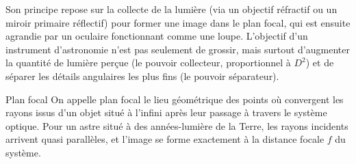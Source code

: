 \documentclass[12pt,a4paper]{report}
\begin{document}
    

Son principe repose sur la collecte de la lumière (via un objectif réfractif ou un miroir primaire réflectif) pour former une image dans le plan focal, qui est ensuite agrandie par un oculaire fonctionnant comme une loupe. L'objectif d'un instrument d'astronomie n'est pas seulement de grossir, mais surtout d'augmenter la quantité de lumière perçue (le pouvoir collecteur, proportionnel à $D^2$) et de séparer les détails angulaires les plus fins (le pouvoir séparateur).

\begin{definition}{Plan focal}
On appelle plan focal le lieu géométrique des points où convergent les rayons issus d'un objet situé à l'infini après leur passage à travers le système optique. Pour un astre situé à des années-lumière de la Terre, les rayons incidents arrivent quasi parallèles, et l'image se forme exactement à la distance focale $f$ du système.
\end{definition}
\end{document}
